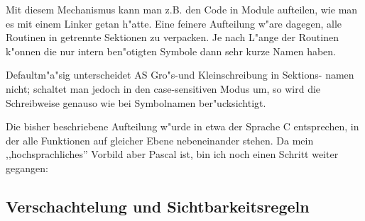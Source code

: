 \documentclass[12pt,a4paper,twoside]{report}
\newcommand{\asname}{AS}
\begin{document}
Mit diesem Mechanismus kann man z.B. den Code in Module aufteilen, wie man
es mit einem Linker getan h"atte.  Eine feinere Aufteilung w"are dagegen,
alle Routinen in getrennte Sektionen zu verpacken.  Je nach L"ange der
Routinen k"onnen die nur intern ben"otigten Symbole dann sehr kurze Namen
haben.
\par
Defaultm"a"sig unterscheidet \asname{} Gro"s-und Kleinschreibung in Sektions-
namen nicht; schaltet man jedoch in den case-sensitiven Modus um, so
wird die Schreibweise genauso wie bei Symbolnamen ber"ucksichtigt.
\par
Die bisher beschriebene Aufteilung w"urde in etwa der Sprache C entsprechen,
in der alle Funktionen auf gleicher Ebene nebeneinander stehen.  Da mein
,,hochsprachliches'' Vorbild aber Pascal ist, bin ich noch einen Schritt
weiter gegangen:


\subsection{Verschachtelung und Sichtbarkeitsregeln}
\end{document}
